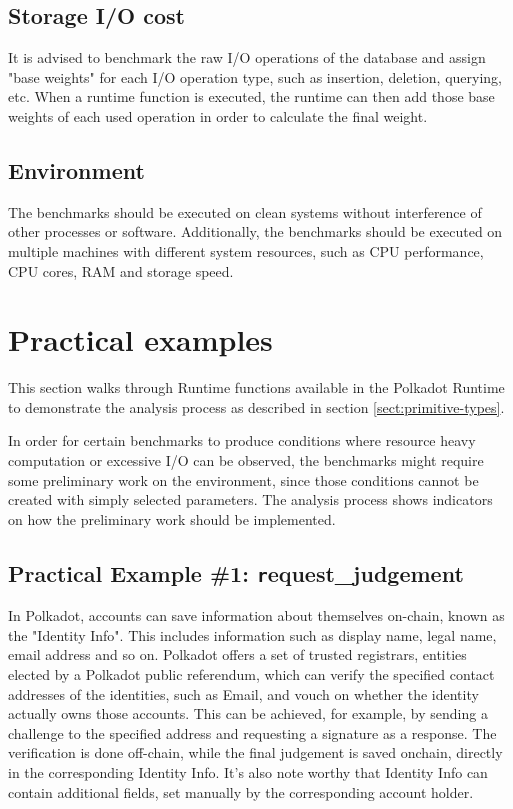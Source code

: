 \documentclass[11pt,a4paper]{article}
\begin{document}
\subsection{Storage I/O cost}
It is advised to benchmark the raw I/O operations of the database and assign
"base weights" for each I/O operation type, such as insertion, deletion,
querying, etc. When a runtime function is executed, the runtime can then add
those base weights of each used operation in order to calculate the final
weight.

\subsection{Environment}
The benchmarks should be executed on clean systems without interference of other
processes or software. Additionally, the benchmarks should be executed on
multiple machines with different system resources, such as CPU performance, CPU
cores, RAM and storage speed.

\section{Practical examples}\label{sec:practical-examples}

This section walks through Runtime functions available in the Polkadot Runtime
to demonstrate the analysis process as described in section
\ref{sect:primitive-types}.
\newline

In order for certain benchmarks to produce conditions where resource heavy
computation or excessive I/O can be observed, the benchmarks might require some
preliminary work on the environment, since those conditions cannot be created
with simply selected parameters. The analysis process shows indicators on how
the preliminary work should be implemented.

\subsection{Practical Example \#1: {\texttt request\_judgement}}

In Polkadot, accounts can save information about themselves on-chain, known as
the "Identity Info". This includes information such as display name, legal name,
email address and so on. Polkadot offers a set of trusted registrars, entities
elected by a Polkadot public referendum, which can verify the specified contact
addresses of the identities, such as Email, and vouch on whether the identity
actually owns those accounts. This can be achieved, for example, by sending a
challenge to the specified address and requesting a signature as a response. The
verification is done off-chain, while the final judgement is saved onchain,
directly in the corresponding Identity Info. It's also note worthy that Identity
Info can contain additional fields, set manually by the corresponding account
holder.
\end{document}
